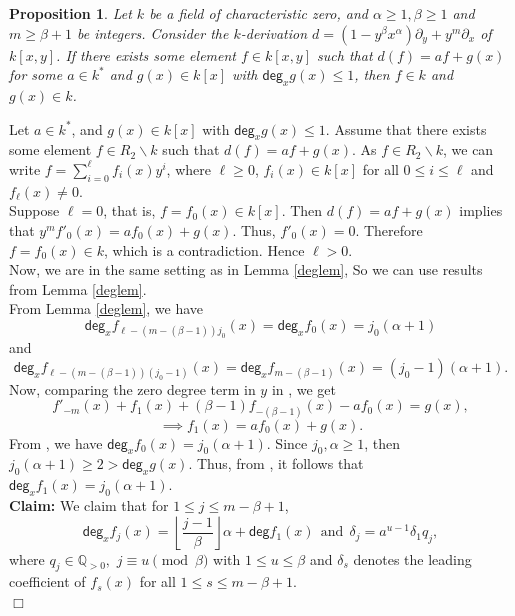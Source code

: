 \documentclass[12pt,reqno]{amsart}
\renewcommand{\deg}{\mathsf{deg}}
\renewcommand{\setminus}{\smallsetminus}
\renewcommand{\leq}{\leqslant}
\renewcommand{\geq}{\geqslant}
\numberwithin{thm}{section}
\newtheorem{prop}[thm]{Proposition}
\theoremstyle{definition}
\numberwithin{equation}{thm}
\renewenvironment{proof}{\par\noindent {\em Proof:}}{\hfill$\Box$\medskip}
\theoremstyle{plain}
\begin{document}
\begin{prop}\label{mainprop}
    Let $k$ be a field of characteristic zero, and $\alpha\ge 1,\beta\ge 1$ and $m\ge \beta+1$ be integers. Consider the $k$-derivation $d=(1-y^\beta x^\alpha)\partial_{y}+y^m\partial_{x}$ of $k[x,y]$. If there exists some element $f\in k[x,y]$ such that $d(f)=af+g(x)$ for some  $a\in k^\ast $ and $g(x)\in k[x]$ with $\deg_x g(x)\le 1$, then $f\in k$ and $g(x)\in k$.
\end{prop}
\begin{proof}
       Let $a\in k^\ast$, and $g(x)\in k[x]$ with $\deg_x g(x)\le 1.$ Assume that there exists some element $f\in R_2\setminus k$ such that $d(f)=af+g(x).$ As $f\in R_2\setminus k$, we can write $f=\sum_{i=0}^\ell f_i(x)y^i$, where $\ell\geq 0$, $f_i(x)\in k[x]$ for all $0\leq i\leq \ell$ and $f_\ell(x)\neq 0$.\\
        Suppose $\ell=0$, that is, $f=f_0(x)\in k[x]$. Then $d(f)=af+g(x)$ implies that $y^mf'_0(x)=af_0(x)+g(x)$. Thus, $f'_0(x)=0.$ Therefore $f=f_0(x)\in k$, which is a contradiction. Hence $\ell>0$.\\
        Now, we are in the same setting as in Lemma \ref{deglem}, So we can use results from Lemma \ref{deglem}.\\
        From Lemma \ref{deglem}, we have 
        \begin{equation}\label{eq4:1}
            \deg_{x}f_{\ell-(m-(\beta-1))j_0}(x)=\deg_{x}f_0(x)=j_0(\alpha+1)
        \end{equation}
        and
        \begin{equation}\label{eq4:2}
            \deg_{x}f_{\ell-(m-(\beta-1))(j_0-1)}(x)=\deg_{x}f_{m-(\beta-1)}(x)=(j_0-1)(\alpha+1).
        \end{equation}
        Now, comparing the zero degree term in $y$ in , we get
        $$f'_{-m}(x)+f_1(x)+(\beta-1)f_{-(\beta-1)}(x)-af_0(x)=g(x),$$
        \begin{equation}\label{eq4:3}
            \implies f_1(x)=af_0(x)+g(x).
        \end{equation}
        From , we have $\deg_x f_0(x)=j_0(\alpha+1)$. Since  $j_0, \alpha\ge 1$, then $j_0(\alpha+1)\geq 2 >  \deg_x g(x)$. Thus, from , it follows that $\deg_x f_1(x)=j_0(\alpha+1)$.\\

        
    \noindent \textbf{Claim:} We claim that for $1\le j\le m-\beta+1$, $$\deg_x f_j(x)=\left\lfloor \frac{j-1}{\beta} \right\rfloor \alpha+\deg f_1(x) \ \ \text{and} \ \ \delta_j=a ^{u-1} \delta_1 q_j,$$ where $q_j\in \mathbb{Q}_{>0},$ $j \equiv u \pmod{\beta}$ with $1\le u \le \beta$ and $\delta_s$ denotes the leading coefficient of $f_s(x)$ for all $1\leq s\leq m-\beta+1$.\\
    

\end{proof}
\end{document}
